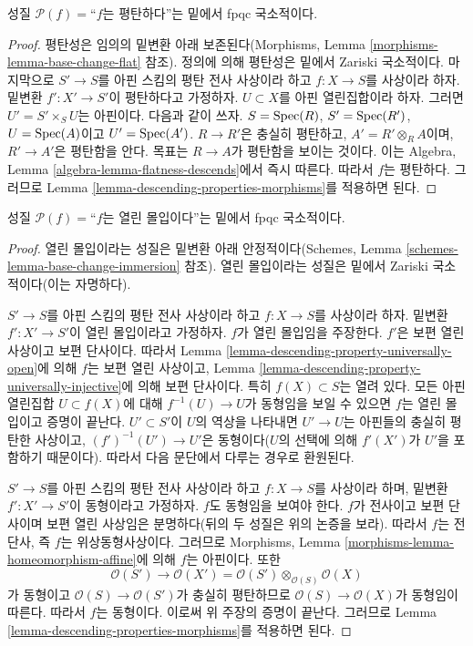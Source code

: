 \begin{lemma}
\label{lemma-descending-property-flat}
성질 $\mathcal{P}(f) =$“$f$는 평탄하다”는 밑에서 fpqc 국소적이다.
\end{lemma}

\begin{proof}
평탄성은 임의의 밑변환 아래 보존된다(Morphisms, Lemma
\ref{morphisms-lemma-base-change-flat} 참조). 정의에 의해 평탄성은
밑에서 Zariski 국소적이다. 마지막으로 $S' \to S$를 아핀 스킴의 평탄
전사 사상이라 하고 $f : X \to S$를 사상이라 하자. 밑변환
$f' : X' \to S'$이 평탄하다고 가정하자. $U \subset X$를 아핀
열린집합이라 하자. 그러면 $U' = S' \times_S U$는 아핀이다. 다음과 같이
쓰자.
$S = \mathop{\mathrm{Spec}}(R)$,
$S' = \mathop{\mathrm{Spec}}(R')$,
$U = \mathop{\mathrm{Spec}}(A)$이고
$U' = \mathop{\mathrm{Spec}}(A')$.
$R \to R'$은 충실히 평탄하고, $A' = R' \otimes_R A$이며,
$R' \to A'$은 평탄함을 안다. 목표는 $R \to A$가 평탄함을 보이는
것이다. 이는 Algebra, Lemma \ref{algebra-lemma-flatness-descends}에서
즉시 따른다. 따라서 $f$는 평탄하다. 그러므로 Lemma
\ref{lemma-descending-properties-morphisms}를 적용하면 된다.
\end{proof}

\begin{lemma}
\label{lemma-descending-property-open-immersion}
성질 $\mathcal{P}(f) =$“$f$는 열린 몰입이다”는 밑에서 fpqc 국소적이다.
\end{lemma}

\begin{proof}
열린 몰입이라는 성질은 밑변환 아래 안정적이다(Schemes, Lemma
\ref{schemes-lemma-base-change-immersion} 참조). 열린 몰입이라는 성질은
밑에서 Zariski 국소적이다(이는 자명하다).

\medskip\noindent
$S' \to S$를 아핀 스킴의 평탄 전사 사상이라 하고 $f : X \to S$를
사상이라 하자. 밑변환 $f' : X' \to S'$이 열린 몰입이라고 가정하자.
$f$가 열린 몰입임을 주장한다. $f'$은 보편 열린 사상이고 보편 단사이다.
따라서 Lemma \ref{lemma-descending-property-universally-open}에 의해
$f$는 보편 열린 사상이고, Lemma
\ref{lemma-descending-property-universally-injective}에 의해 보편
단사이다. 특히 $f(X) \subset S$는 열려 있다. 모든 아핀 열린집합
$U \subset f(X)$에 대해 $f^{-1}(U) \to U$가 동형임을 보일 수 있으면
$f$는 열린 몰입이고 증명이 끝난다. $U' \subset S'$이 $U$의 역상을
나타내면 $U' \to U$는 아핀들의 충실히 평탄한 사상이고,
$(f')^{-1}(U') \to U'$은 동형이다($U$의 선택에 의해 $f'(X')$가
$U'$을 포함하기 때문이다). 따라서 다음 문단에서 다루는 경우로
환원된다.

\medskip\noindent
$S' \to S$를 아핀 스킴의 평탄 전사 사상이라 하고 $f : X \to S$를
사상이라 하며, 밑변환 $f' : X' \to S'$이 동형이라고 가정하자.
$f$도 동형임을 보여야 한다. $f$가 전사이고 보편 단사이며 보편 열린
사상임은 분명하다(뒤의 두 성질은 위의 논증을 보라). 따라서 $f$는
전단사, 즉 $f$는 위상동형사상이다. 그러므로 Morphisms, Lemma
\ref{morphisms-lemma-homeomorphism-affine}에 의해 $f$는 아핀이다. 또한
$$
\mathcal{O}(S') \to
\mathcal{O}(X') =
\mathcal{O}(S') \otimes_{\mathcal{O}(S)} \mathcal{O}(X)
$$
가 동형이고 $\mathcal{O}(S) \to \mathcal{O}(S')$가 충실히
평탄하므로 $\mathcal{O}(S) \to \mathcal{O}(X)$가 동형임이 따른다.
따라서 $f$는 동형이다. 이로써 위 주장의 증명이 끝난다. 그러므로 Lemma
\ref{lemma-descending-properties-morphisms}를 적용하면 된다.
\end{proof}

